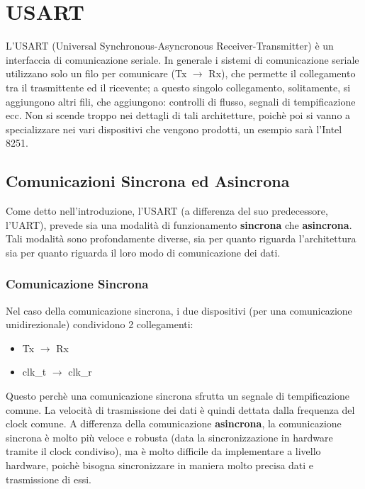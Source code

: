 \section{USART}

L'USART (Universal Synchronous-Asyncronous Receiver-Transmitter) è un interfaccia di comunicazione seriale. In generale i sistemi di comunicazione seriale utilizzano solo un filo per comunicare (Tx $\rightarrow$ Rx), che permette il collegamento tra il trasmittente ed il ricevente; a questo singolo collegamento, solitamente, si aggiungono altri fili, che aggiungono: controlli di flusso, segnali di tempificazione ecc.
Non si scende troppo nei dettagli di tali architetture, poichè poi si vanno a specializzare nei vari dispositivi che vengono prodotti, un esempio sarà l'Intel 8251.

\subsection{Comunicazioni Sincrona ed Asincrona}
Come detto nell'introduzione, l'USART (a differenza del suo predecessore, l'UART), prevede sia una modalità di funzionamento \textbf{sincrona} che \textbf{asincrona}.
Tali modalità sono profondamente diverse, sia per quanto riguarda l'architettura sia per quanto riguarda il loro modo di comunicazione dei dati.

\subsubsection{Comunicazione Sincrona}
Nel caso della comunicazione sincrona, i due dispositivi (per una comunicazione unidirezionale) condividono 2 collegamenti:
\begin{itemize}
    \item Tx $\rightarrow$ Rx
    \item clk\_t $\rightarrow$ clk\_r
\end{itemize}

Questo perchè una comunicazione sincrona sfrutta un segnale di tempificazione comune. La velocità di trasmissione dei dati è quindi dettata dalla frequenza del clock comune. A differenza della comunicazione \textbf{asincrona}, la comunicazione sincrona è molto più veloce e robusta (data la sincronizzazione in hardware tramite il clock condiviso), ma è molto difficile da implementare a livello hardware, poichè bisogna sincronizzare in maniera molto precisa dati e trasmissione di essi.

